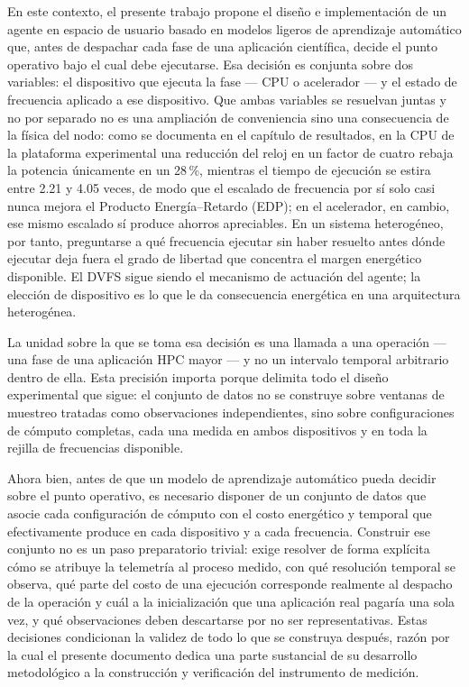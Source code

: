 \documentclass[12pt,oneside,spanish]{book}
\begin{document}
En este contexto, el presente trabajo propone el diseño e implementación de un agente en espacio de usuario basado en modelos ligeros de aprendizaje automático que, antes de despachar cada fase de una aplicación científica, decide el punto operativo bajo el cual debe ejecutarse. Esa decisión es conjunta sobre dos variables: el dispositivo que ejecuta la fase --- CPU o acelerador --- y el estado de frecuencia aplicado a ese dispositivo. Que ambas variables se resuelvan juntas y no por separado no es una ampliación de conveniencia sino una consecuencia de la física del nodo: como se documenta en el capítulo de resultados, en la CPU de la plataforma experimental una reducción del reloj en un factor de cuatro rebaja la potencia únicamente en un 28\,\%, mientras el tiempo de ejecución se estira entre 2.21 y 4.05 veces, de modo que el escalado de frecuencia por sí solo casi nunca mejora el Producto Energía--Retardo (EDP); en el acelerador, en cambio, ese mismo escalado sí produce ahorros apreciables. En un sistema heterogéneo, por tanto, preguntarse a qué frecuencia ejecutar sin haber resuelto antes dónde ejecutar deja fuera el grado de libertad que concentra el margen energético disponible. El DVFS sigue siendo el mecanismo de actuación del agente; la elección de dispositivo es lo que le da consecuencia energética en una arquitectura heterogénea.

La unidad sobre la que se toma esa decisión es una llamada a una operación --- una fase de una aplicación HPC mayor --- y no un intervalo temporal arbitrario dentro de ella. Esta precisión importa porque delimita todo el diseño experimental que sigue: el conjunto de datos no se construye sobre ventanas de muestreo tratadas como observaciones independientes, sino sobre configuraciones de cómputo completas, cada una medida en ambos dispositivos y en toda la rejilla de frecuencias disponible.

Ahora bien, antes de que un modelo de aprendizaje automático pueda decidir sobre el punto operativo, es necesario disponer de un conjunto de datos que asocie cada configuración de cómputo con el costo energético y temporal que efectivamente produce en cada dispositivo y a cada frecuencia. Construir ese conjunto no es un paso preparatorio trivial: exige resolver de forma explícita cómo se atribuye la telemetría al proceso medido, con qué resolución temporal se observa, qué parte del costo de una ejecución corresponde realmente al despacho de la operación y cuál a la inicialización que una aplicación real pagaría una sola vez, y qué observaciones deben descartarse por no ser representativas. Estas decisiones condicionan la validez de todo lo que se construya después, razón por la cual el presente documento dedica una parte sustancial de su desarrollo metodológico a la construcción y verificación del instrumento de medición.
\end{document}
